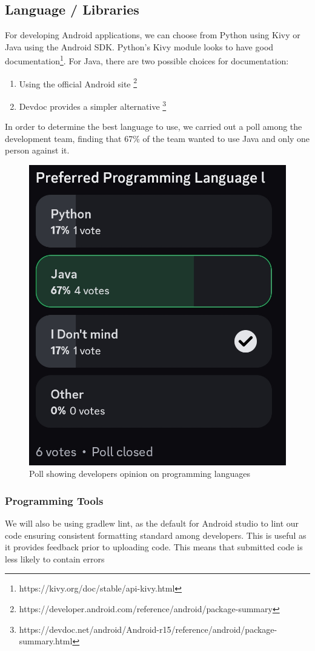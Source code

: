 \subsection{Language / Libraries}
For developing Android applications, we can choose from Python using Kivy or Java using the Android SDK.
Python's Kivy module looks to have good documentation\footnote{https://kivy.org/doc/stable/api-kivy.html}.
For Java, there are two possible choices for documentation:
\begin{enumerate}
  \item Using the official Android site
    \footnote{https://developer.android.com/reference/android/package-summary} %
  \item Devdoc provides a simpler alternative
    \footnote{https://devdoc.net/android/Android-r15/reference/android/package-summary.html} %
\end{enumerate}
\par
In order to determine the best language to use, we carried out a poll among the development team,
finding that 67\% of the team wanted to use Java and only one person against it.
\begin{figure}[h!]
    \centering
    \includegraphics[width=0.5\linewidth]{programmingLanguagePoll}
    \caption{Poll showing developers opinion on programming languages}
    \label{fig:programmingLanguagePoll}
\end{figure}
\par
\subsubsection{Programming Tools}
We will also be using gradlew lint, as the default for Android studio to lint our code
ensuring consistent formatting standard among developers. This is useful as it provides
feedback prior to uploading code. This means that submitted code is less likely to contain
errors
